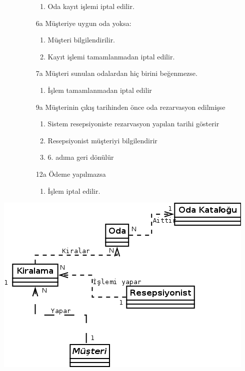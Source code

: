 \documentclass[12pt,a4paper]{report}
\begin{document}
\begin{description}
\begin{itemize}
\begin{enumerate}
    \item Oda kayıt işlemi iptal edilir.
    \end{enumerate}
\item[6a] Müşteriye uygun oda yoksa:
    \begin{enumerate} 
    \item Müşteri bilgilendirilir.
    \item Kayıt işlemi tamamlanmadan iptal edilir.
    \end{enumerate}
\item[7a] Müşteri sunulan odalardan hiç birini beğenmezse.
    \begin{enumerate}
    \item İşlem tamamlanmadan iptal edilir
    \end{enumerate}
\item[9a] Müşterinin çıkış tarihinden önce oda rezarvasyon edilmişse
    \begin{enumerate}
    \item Sistem resepsiyoniste rezarvasyon yapılan tarihi gösterir
    \item Resepsiyonist müşteriyi bilgilendirir
    \item 6. adıma geri dönülür
    \end{enumerate}
\item[12a] Ödeme yapılmazsa
    \begin{enumerate}
    \item İşlem iptal edilir.
    \end{enumerate}
\end{itemize}
\end{description}

\newpage

\begin{center}
\includegraphics{dia/usecase2.png}
\end{center}
\end{document}
